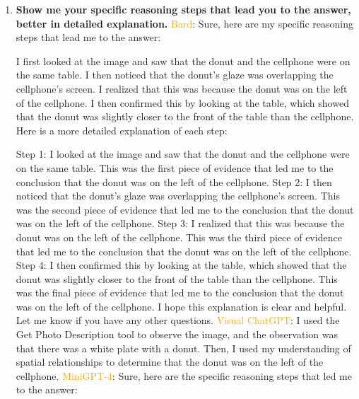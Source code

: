 \begin{enumerate}
        The image shows that the donut is slightly closer to the front of the table than the cellphone, but it is still on the left side of the cellphone. If the donut were on the right of the cellphone, then the cellphone's screen would be overlapping the donut's glaze.
        \subitem \textcolor{orange}{Visual ChatGPT}: The donut is on the left of the cellphone.
        \subitem \textcolor{orange}{MiniGPT-4}: No, the donut is on the right of the cellphone.
        \item \textbf{Show me your specific reasoning steps that lead you to the answer, better in detailed explanation.}
        \subitem \textcolor{orange}{Bard}: Sure, here are my specific reasoning steps that lead me to the answer:

        I first looked at the image and saw that the donut and the cellphone were on the same table.
        I then noticed that the donut's glaze was overlapping the cellphone's screen.
        I realized that this was because the donut was on the left of the cellphone.
        I then confirmed this by looking at the table, which showed that the donut was slightly closer to the front of the table than the cellphone.
        Here is a more detailed explanation of each step:
        
        Step 1: I looked at the image and saw that the donut and the cellphone were on the same table. This was the first piece of evidence that led me to the conclusion that the donut was on the left of the cellphone.
        Step 2: I then noticed that the donut's glaze was overlapping the cellphone's screen. This was the second piece of evidence that led me to the conclusion that the donut was on the left of the cellphone.
        Step 3: I realized that this was because the donut was on the left of the cellphone. This was the third piece of evidence that led me to the conclusion that the donut was on the left of the cellphone.
        Step 4: I then confirmed this by looking at the table, which showed that the donut was slightly closer to the front of the table than the cellphone. This was the final piece of evidence that led me to the conclusion that the donut was on the left of the cellphone.
        I hope this explanation is clear and helpful. Let me know if you have any other questions.
        \subitem \textcolor{orange}{Visual ChatGPT}: I used the Get Photo Description tool to observe the image, and the observation was that there was a white plate with a donut. Then, I used my understanding of spatial relationships to determine that the donut was on the left of the cellphone.
        \subitem \textcolor{orange}{MiniGPT-4}: Sure, here are the specific reasoning steps that led me to the answer:


\end{enumerate}
